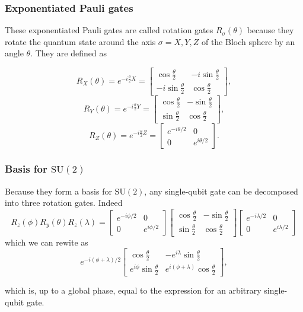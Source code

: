 \documentclass{beamer}
\begin{document}
\begin{frame}
\frametitle{Exponentiated Pauli gates}

These exponentiated Pauli gates are called rotation gates
$R_{\sigma}(\theta)$ because they rotate the quantum state around the
axis $\sigma=X,Y,Z$ of the Bloch sphere by an angle $\theta$. They are
defined as

\[
R_X(\theta)=e^{-i\frac{\theta}{2}X}=
\begin{bmatrix}
\cos\frac{\theta}{2} & -i\sin\frac{\theta}{2} \\
-i\sin\frac{\theta}{2} & \cos\frac{\theta}{2} 
\end{bmatrix},
\]
\[
R_Y(\theta)=e^{-i\frac{\theta}{2}Y}=
\begin{bmatrix}
\cos\frac{\theta}{2} & -\sin\frac{\theta}{2} \\
\sin\frac{\theta}{2} & \cos\frac{\theta}{2} 
\end{bmatrix},
\]
\[
R_Z(\theta)=e^{-i\frac{\theta}{2}Z}=\begin{bmatrix}
e^{-i\theta/2} & 0 \\
0 & e^{i\theta/2}\end{bmatrix}.
\]
\end{frame}

\begin{frame}
\frametitle{Basis for $\mathrm{SU}(2)$}

Because they form a basis for $\mathrm{SU}(2)$, any single-qubit gate
can be decomposed into three rotation gates. Indeed
\[
R_z(\phi)R_y(\theta)R_z(\lambda)=
\begin{bmatrix}
e^{-i\phi/2} & 0 \\
0 & e^{i\phi/2}
\end{bmatrix}
\begin{bmatrix}
\cos\frac{\theta}{2} & -\sin\frac{\theta}{2} \\
\sin\frac{\theta}{2} & \cos\frac{\theta}{2} 
\end{bmatrix}
\begin{bmatrix}
e^{-i\lambda/2} & 0 \\
0 & e^{i\lambda/2}
\end{bmatrix}
\]
which we can rewite as
\[
e^{-i(\phi+\lambda)/2}
\begin{bmatrix}
\cos\frac{\theta}{2} & -e^{i\lambda}\sin\frac{\theta}{2}\\
e^{i\phi}\sin\frac{\theta}{2} & e^{i(\phi+\lambda)}\cos\frac{\theta}{2}
\end{bmatrix},
\]

which is, up to a global phase, equal to the expression for an arbitrary single-qubit gate.
\end{frame}
\end{document}
